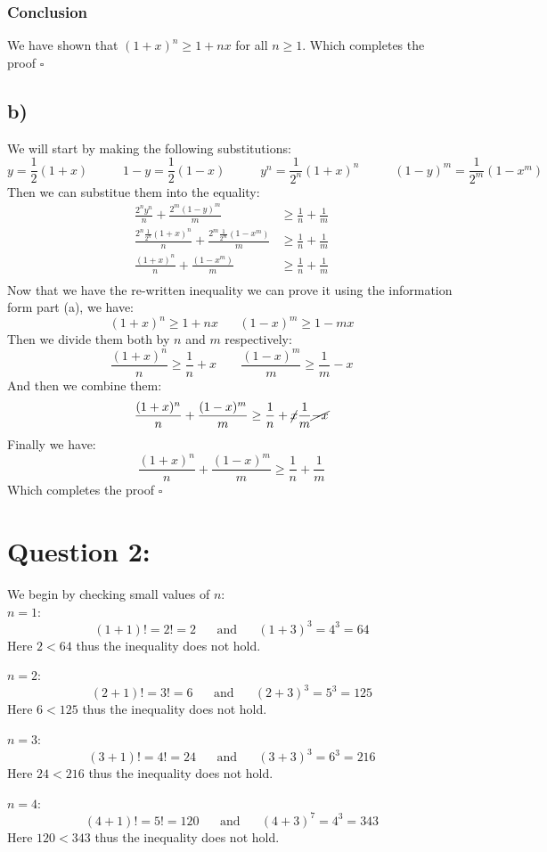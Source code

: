 \documentclass{article}
\begin{document}
\subsubsection*{Conclusion}
We have shown that $(1+x)^{n}\geq 1+nx$ for all $n\geq 1$. Which completes the proof $\square$
\subsection*{b)}
We will start by making the following substitutions: 
$$y=\frac{1}{2}(1+x)\;\;\;\;\;\;\;\;\;\;1-y=\frac{1}{2}(1-x)\;\;\;\;\;\;\;\;\;\;y^{n}=\frac{1}{2^{n}}(1+x)^{n}\;\;\;\;\;\;\;\;\;\;(1-y)^{m}=\frac{1}{2^{m}}(1-x^{m})$$
Then we can substitue them into the equality: $$\begin{aligned}
    \frac{2^{n}y^{n}}{n}+\frac{2^{m}(1-y)^m}{m}&\geq \frac{1}{n}+\frac{1}{m}\\
    \frac{2^{n}\frac{1}{2^{n}}(1+x)^{n}}{n}+\frac{2^{m}\frac{1}{2^{m}}(1-x^{m})}{m}&\geq \frac{1}{n}+\frac{1}{m}\\
    \frac{(1+x)^{n}}{n}+\frac{(1-x^{m})}{m}&\geq \frac{1}{n}+\frac{1}{m}\\
\end{aligned}$$
Now that we have the re-written inequality we can prove it using the information form part (a), we have: $$(1+x)^{n}\geq 1+nx\;\;\;\;\;\;(1-x)^{m}\geq 1-mx$$
Then we divide them both by $n$ and $m$ respectively: $$\frac{(1+x)^{n}}{n}\geq \frac{1}{n}+x\;\;\;\;\;\;\;\frac{(1-x)^{m}}{m}\geq \frac{1}{m}-x$$And then we combine them:
$$\frac{(1+x)^{n}}{n}+\frac{(1-x)^{m}}{m}\geq\frac{1}{n}+\cancel{x}\frac{1}{m}\cancel{-x}$$Finally we have: $$\frac{(1+x)^{n}}{n}+\frac{(1-x)^{m}}{m}\geq\frac{1}{n}+\frac{1}{m}$$Which completes the proof $\square$
\newpage
\section*{Question 2:}
We begin by checking small values of $n$:\\

$n=1$:
$$(1+1)!=2!=2\;\;\;\;\;\;\text{and}\;\;\;\;\;\;(1+3)^{3}=4^{3}=64$$
Here $2<64$ thus the inequality does not hold.

$n=2$:
$$(2+1)!=3!=6\;\;\;\;\;\;\text{and}\;\;\;\;\;\;(2+3)^{3}=5^{3}=125$$
Here $6<125$ thus the inequality does not hold.

$n=3$:
$$(3+1)!=4!=24\;\;\;\;\;\;\text{and}\;\;\;\;\;\;(3+3)^{3}=6^{3}=216$$
Here $24<216$ thus the inequality does not hold.

$n=4$:
$$(4+1)!=5!=120\;\;\;\;\;\;\text{and}\;\;\;\;\;\;(4+3)^{7}=4^{3}=343$$
Here $120<343$ thus the inequality does not hold.
\end{document}
